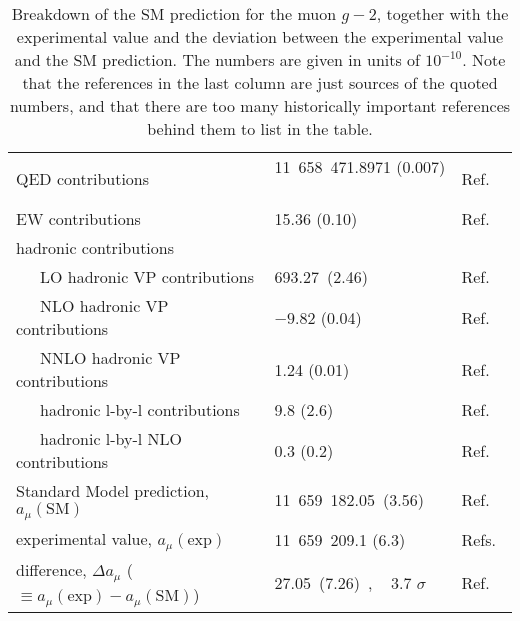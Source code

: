 \begin{table*}[thbp]
\caption{Breakdown of the SM prediction for the muon $g-2$,
together with the experimental value
and the deviation between the experimental value and 
the SM prediction.  The numbers are given in units of $10^{-10}$.
Note that the references in the last column are just sources
of the quoted numbers, and that there are too many
historically important references behind them to list in the table.}
%
\label{table:a_mu_SM}
%
\begin{center} \begin{tabular}[t]{l|ll}
\hline
  QED contributions 
 & \phantom{$-$}11~658~471.8971 (0.007)
 ~\hspace*{0.2cm}~ & Ref.~\cite{Aoyama-etal-2017} \\
  EW contributions & \phantom{$-$00~000~0}15.36 (0.10)
 & Ref.~\cite{Gnendiger-etal} \\
  hadronic contributions &  &\\
~~~LO hadronic VP contributions  &
  \phantom{$-$00~000~}693.27~(2.46) & Ref.~\cite{KNT18}\\
  ~~~NLO hadronic VP contributions &
  \phantom{00~000~00}$-9.82$ (0.04) &  Ref.~\cite{KNT18} \\
  ~~~NNLO hadronic VP contributions & 
\phantom{$-$00~000~00}1.24 (0.01)  & Ref.~\cite{Kurz-etal-hadNNLO}\\
  ~~~hadronic l-by-l contributions & 
\phantom{$-$00~000~00}9.8 (2.6) &
 Ref.~\cite{Nyffeler-LbL} \\
  ~~~hadronic l-by-l NLO contributions & 
\phantom{$-$00~000~00}0.3 (0.2) &
 Ref.~\cite{Colangelo-etal-NLOLbL} \\
\hline \hline
  Standard Model prediction, $a_\mu(\text{SM})$& 
   \phantom{$-$}11~659~182.05~(3.56)   & Ref.~\cite{KNT18} \\
  experimental value, $a_\mu(\text{exp})$
 & \phantom{$-$}11~659~209.1 (6.3) & Refs.~\cite{Bennett:2004pv,PDG17} \\
\hline \hline
 difference, $\Delta a_\mu$ 
 ($\equiv a_\mu(\text{exp}) - a_\mu(\text{SM})$) & 
\phantom{$-$0~000~00}27.05~(7.26)~, ~ 3.7 $\sigma$ & Ref.~\cite{KNT18} \\
\hline
\end{tabular} \end{center} \end{table*}




